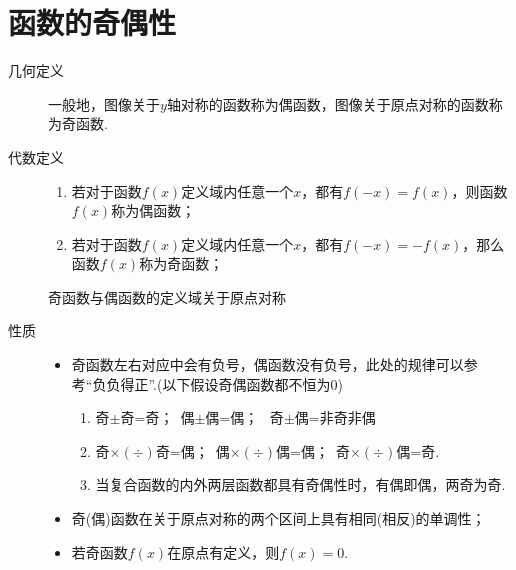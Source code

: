 \section{函数的奇偶性}
  \begin{description}
    \item[几何定义] 一般地，图像关于$y$轴对称的函数称为偶函数，图像关于原点对称的函数称为奇函数.
    \item[代数定义]
    \begin{enumerate}[label=\arabic*)]
      \item[] \hspace{-2em}若对于函数$f(x)$定义域内任意一个$x$，都有$f(-x)=f(x)$，则函数$f(x)$称为偶函数；
      \item[] 若对于函数$f(x)$定义域内任意一个$x$，都有$f(-x)=-f(x)$，那么函数$f(x)$称为奇函数；
    \end{enumerate}
    {\kaishu
      奇函数与偶函数的定义域关于原点对称
    }
    \item[性质]
      \begin{itemize}
        \item
          奇函数左右对应中会有负号，偶函数没有负号，此处的规律可以参考“负负得正”.{\kaishu (以下假设奇偶函数都不恒为$ 0 $)}
          \begin{enumerate}[label=\circled{\arabic*}]
            \kaishu
            \item 奇$\pm$奇=奇；\  偶$\pm $偶=偶；
            \  奇$\pm$偶=非奇非偶
            \item 奇$\times(\div)$奇=偶；\ 偶$\times(\div)$偶=偶；\  奇$\times(\div)$偶=奇.
            \item 当复合函数的内外两层函数都具有奇偶性时，有偶即偶，两奇为奇.
          \end{enumerate}
        \item
          奇(偶)函数在关于原点对称的两个区间上具有相同(相反)的单调性；
        \item 若奇函数$f(x)$在原点有定义，则$f(x)=0$.
      \end{itemize}
  \end{description}

